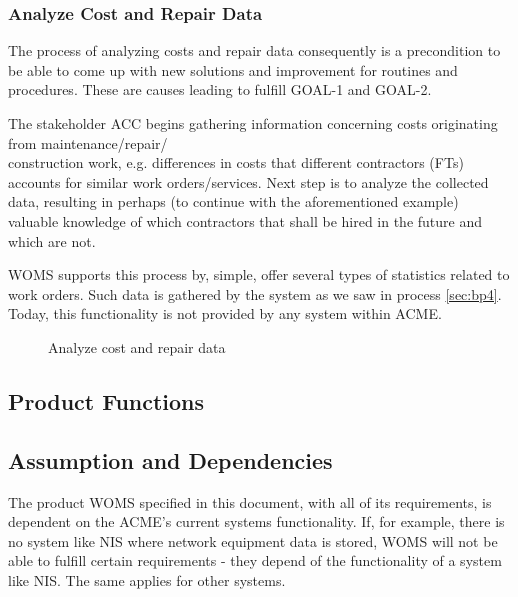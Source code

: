 \subsubsection{Analyze Cost and Repair Data}
\label{sec:bp6}
The process of analyzing costs and repair data consequently is a precondition to be able to come up with new solutions and improvement for routines and procedures. These are causes leading to fulfill GOAL-1 and GOAL-2. 

The stakeholder ACC begins gathering information concerning costs originating from maintenance/repair/\\construction work, e.g. differences in costs that different contractors (FTs) accounts for similar work orders/services.  Next step is to analyze the collected data, resulting in perhaps (to continue with the aforementioned example) valuable knowledge of which contractors that shall be hired in the future and which are not. 

WOMS supports this process by, simple, offer several types of statistics related to work orders. Such data is gathered by the system as we saw in process \ref{sec:bp4}. Today, this functionality is not provided by any system within ACME.
\begin{figure}[H]
	\centering
	\setlength\fboxsep{7pt}
	\setlength\fboxrule{0.5pt}
	\label{fig:analyze}
	\caption{Analyze cost and repair data}
\end{figure}
%
\subsection{Product Functions}

\subsection{Assumption and Dependencies}
\label{sec:assumption_and_dependencies}
The product WOMS specified in this document, with all of its requirements, is dependent on the ACME's current systems functionality. If, for example, there is no system like NIS where network equipment data is stored, WOMS will not be able to fulfill certain requirements - they depend of the functionality of a system like NIS. The same applies for other systems. 

